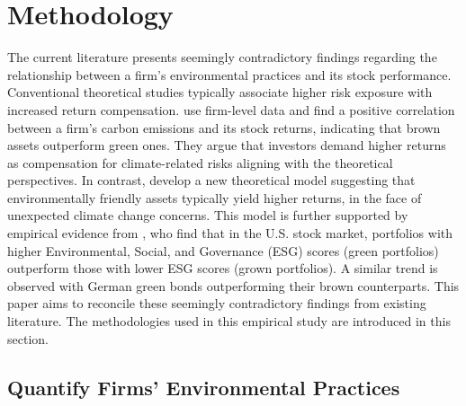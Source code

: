 \documentclass[12pt]{article}
\begin{document}
%
\section{Methodology} \label{sec:Methodology}
%
The current literature presents seemingly contradictory findings regarding the relationship between a firm's environmental practices and its stock performance. Conventional theoretical studies typically associate higher risk exposure with increased return compensation. \citet{bolton2021investors} use firm-level data and find a positive correlation between a firm's carbon emissions and its stock returns, indicating that brown assets outperform green ones. They argue that investors demand higher returns as compensation for climate-related risks aligning with the theoretical perspectives. In contrast, \cite{pastor2021sustainable} develop a new theoretical model suggesting that environmentally friendly assets typically yield higher returns, in the face of unexpected climate change concerns. This model is further supported by empirical evidence from \cite{pastor2022dissecting}, who find that in the U.S. stock market, portfolios with higher Environmental, Social, and Governance (ESG) scores (green portfolios) outperform those with lower ESG scores (grown portfolios). A similar trend is observed with German green bonds outperforming their brown counterparts. This paper aims to reconcile these seemingly contradictory findings from existing literature. The methodologies used in this empirical study are introduced in this section.

\subsection{Quantify Firms' Environmental Practices}
\end{document}
